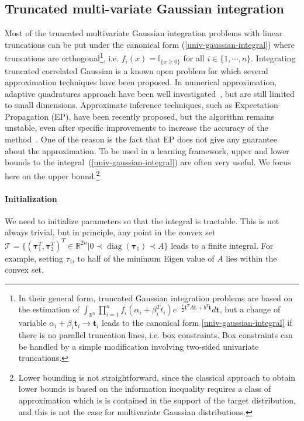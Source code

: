 \documentclass{article} %
\renewcommand{\t}{\mathbf{t}}
\newcommand{\diag}[1]{\mathop{\textrm{diag}}\left(#1\right)}
\newcommand{\tauspace}{\mathcal{T}}
\newcommand{\transp}{^{T}}
\def\Indic#1{\mathbb{I}_{\{#1\}}}
\def\A{A}
\def\btau{{\bm{\tau}}}
\renewcommand{\Re}{\mathbb{R}}
\begin{document}
\subsection{Truncated multi-variate Gaussian integration}
Most of the truncated multivariate Gaussian integration problems with linear
truncations can be put under the canonical form (\ref{univ-gaussian-integral})
where truncations are orthogonal\footnote{ In their general form, truncated Gaussian integration problems
are based on the estimation of $\int_{\Re^n}  \prod_{i=1}^n f_i(\alpha_i +
\beta_i\transp t_i) e^{-\frac 12 \t\transp \A \t + b\transp \t} d\t$, but a
change of variable $\alpha_i + \beta_i\t_i \rightarrow \t_i$ leads to the
canonical form \eqref{univ-gaussian-integral} if there is no parallel truncation
lines, i.e. box constraints. Box constraints can be handled by a simple
modification involving two-sided univariate truncations. 
}, i.e.
 $f_i(x)=\Indic{x\ge 0}$ for all $i\in\{1,\cdots,n\}$.
Integrating truncated correlated Gaussian is a known open problem for which
several approximation techniques have been proposed.
In numerical approximation,
adaptive quadratures approach have been well
investigated~\citep{genz2009computation}, but are still limited to small
dimensions. Approximate inference techniques,
such as Expectation-Propagation (EP), have been recently proposed, but the algorithm
remains unstable, even after specific improvements to increase the accuracy of
the method~\citep{Cunningham-et-al-Gaussian-EP2012}.
One of the reason is the fact that EP does not give any guarantee about the
approximation. To be used in a learning framework, upper and lower
bounds to the integral~(\ref{univ-gaussian-integral}) are often very useful. 
We focus here on the upper bound.\footnote{Lower bounding is not straightforward, since the
classical approach to obtain lower bounds is based on the information inequality
requires a class of approximation which is is contained in the support of the
target distribution, and this is not the case for multivariate Gaussian
distributions.} 
%
\paragraph{Initialization}
We need to initialize parameters so that the integral is tractable. This is not always trivial, but in principle, 
any point in the convex set $\tauspace=\{(\btau_1\transp, \btau_2\transp)\transp \in\Re^{2n} | 0\prec\diag{\btau_1}\prec A \}$ leads to a finite integral. For example, setting $\tau_{1i}$ to half of the minimum Eigen value of $A$ lies within the convex set.
\end{document}
